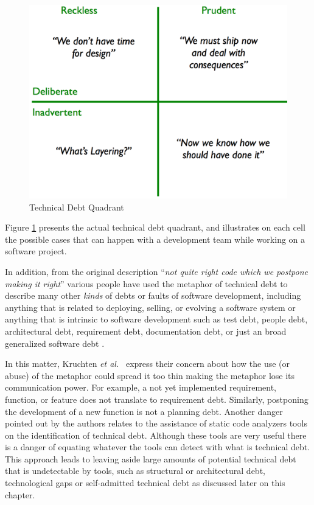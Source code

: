  
\begin{figure}[thb!]
  \centering
  \vspace{5mm}
  \includegraphics[width=.65\textwidth]{figures/literature_review/technical_debt_quadrant.png}
  \caption{Technical Debt Quadrant}
  \label{fig:technical_debt_quadrant}
\end{figure}


Figure \ref{fig:technical_debt_quadrant} presents the actual technical debt quadrant, and illustrates on each cell the possible cases that can happen with a development team while working on a software project. 

In addition, from the original description ``\textit{not quite right code which we postpone making it right}'' various people have used the metaphor of technical debt to describe many other \emph{kinds} of debts or faults of software development, including anything that is related to deploying, selling, or evolving a software system or anything that is intrinsic to software development such as test debt, people debt, architectural debt, requirement debt, documentation debt, or just an broad generalized software debt \cite{sterling2010book}. 

In this matter, Kruchten \textit{et al.}~\cite{kruchten2012IEEE} express their concern about how the use (or abuse) of the metaphor could spread it too thin making the metaphor lose its communication power. For example, a not yet implemented requirement, function, or feature does not translate to  requirement debt. Similarly, postponing the development of a new function is not a planning debt. Another danger pointed out by the authors relates to the assistance of static code analyzers tools on the identification of technical debt. Although these tools are very useful there is a danger of equating whatever the tools can detect with what is technical debt. This approach leads to leaving aside large amounts of potential technical debt that is undetectable by tools, such as structural or architectural debt, technological gaps or self-admitted technical debt as discussed later on this chapter. 


